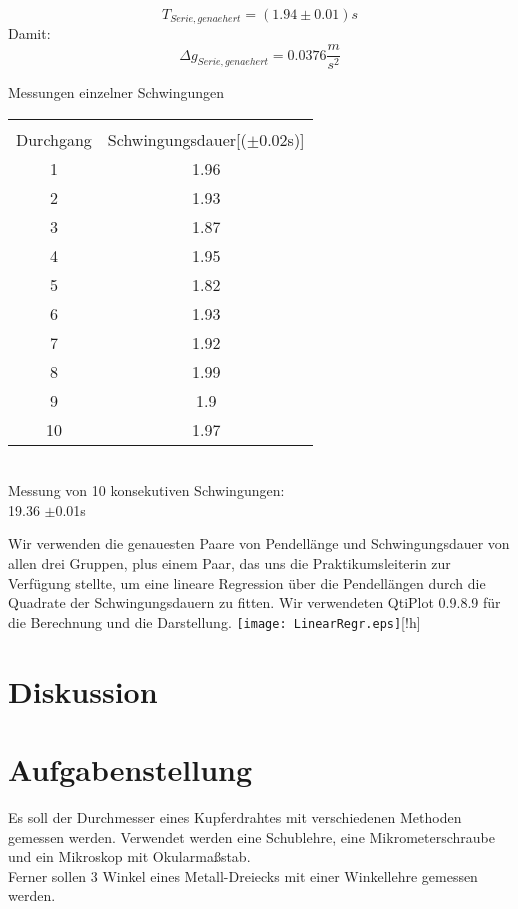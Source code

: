 \documentclass{article}
\begin{document}
\begin{equation}
T_{Serie,genaehert} = (1.94 \pm 0.01)s
\end{equation}
Damit:
\begin{equation}
\Delta g_{Serie,genaehert} = 0.0376 \frac{m}{s^2}
\end{equation}
\begin{table}
\begin{center}
Messungen einzelner Schwingungen\\

\begin{tabular}{|c|c|}
\hline \\
Durchgang & Schwingungsdauer[($\pm$0.02s)]\\
\hline 1&1.96\\
\hline 2&1.93\\
\hline 3&1.87\\
\hline 4&1.95\\
\hline 5&1.82\\
\hline 6&1.93\\
\hline 7&1.92\\
\hline 8&1.99\\
\hline 9&1.9\\
\hline 10&1.97\\
\hline

\end{tabular} \\
Messung von 10 konsekutiven Schwingungen:\\
19.36 $\pm$0.01s
\end{center}
\end{table}

Wir verwenden die genauesten Paare von Pendellänge und Schwingungsdauer von allen drei Gruppen, plus einem Paar, das uns die Praktikumsleiterin zur Verfügung stellte, um eine lineare Regression über die Pendellängen durch die Quadrate der Schwingungsdauern zu fitten. Wir verwendeten QtiPlot 0.9.8.9 für die Berechnung und die Darstellung. 
\texttt{[image: LinearRegr.eps]}[!h]
\section{Diskussion}

\section{Aufgabenstellung}
Es soll der Durchmesser eines Kupferdrahtes mit verschiedenen Methoden gemessen werden. Verwendet werden eine Schublehre, eine Mikrometerschraube und ein Mikroskop mit Okularmaßstab.\\
Ferner sollen 3 Winkel eines Metall-Dreiecks mit einer Winkellehre gemessen werden.
\end{document}
